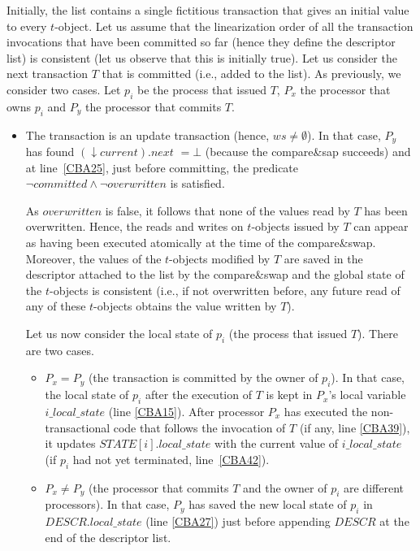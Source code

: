 \begin{proofL}
Initially, the  list  contains a single fictitious  transaction  that gives
an initial value to every  $t$-object. 
Let us assume that the linearization order of all the transaction invocations 
that have been committed  so far (hence they define the descriptor list) is 
consistent  (let us observe that this is initially true). 
Let us consider  the next transaction $T$ that is committed (i.e., added to
the list). 
As previously, we consider two cases.  Let $p_i$ be the process that issued
$T$,  $P_x$ the  processor that  owns $p_i$  and $P_y$  the  processor that
commits $T$.    
%
\begin{itemize}
\item 
The transaction is an update transaction (hence, $ws\neq \emptyset$). 
In that case, $P_y$ has found $(\downarrow current).next$ $=\bot$
(because  the compare\&sap  succeeds) and  at line~\ref{CBA25}, just before
committing,  the predicate  $\neg committed \wedge \neg overwritten$ 
is satisfied.  

As  $overwritten$ is false, it follows that none of the values read by $T$ 
has been overwritten. Hence,  the reads and writes on 
$t$-objects issued by $T$ can appear as having been executed atomically at 
the time of the compare\&swap. Moreover,  the values of the $t$-objects 
modified by $T$  are saved in the  descriptor attached to the list
by the compare\&swap and the global state of the $t$-objects is 
consistent (i.e., if not overwritten  before, any future read of any of these 
$t$-objects obtains the value  written by $T$). 

Let us now consider the local state of $p_i$ (the process that issued $T$). 
There are  two cases. 
\begin{itemize}
\item $P_x=P_y$ (the transaction is committed by the owner of $p_i$). 
In that case, the local state of $p_i$ after the execution of $T$ 
is kept in $P_x$'s local variable $i\_local\_state$ (line \ref{CBA15}). 
After processor $P_x$ has executed the 
non-transactional code that follows the invocation of $T$ (if any, line
\ref{CBA39}), it  updates $\mathit{STATE}[i].local\_state$ with 
the current value of  $i\_local\_state$ (if $p_i$ had not yet terminated,
line~\ref{CBA42}). 
%
\item $P_x \neq P_y$ (the processor that commits $T$ and the owner of $p_i$ 
are different processors). 
In that case, $P_y$ has saved the new local state of $p_i$ in 
$\mathit{DESCR}.local\_state$ (line \ref{CBA27}) just before 
appending $\mathit{DESCR}$ at the end of the descriptor list. 


\end{itemize}
\end{itemize}
\end{proofL}
